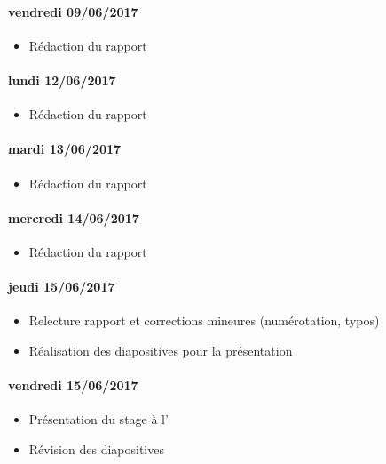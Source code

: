 \paragraph{vendredi 09/06/2017}
\begin{itemize}
  \item Rédaction du rapport
\end{itemize}

\paragraph{lundi 12/06/2017}
\begin{itemize}
  \item Rédaction du rapport
\end{itemize}

\paragraph{mardi 13/06/2017}
\begin{itemize}
  \item Rédaction du rapport
\end{itemize}

\paragraph{mercredi 14/06/2017}
\begin{itemize}
  \item Rédaction du rapport
\end{itemize}

\paragraph{jeudi 15/06/2017}
\begin{itemize}
  \item Relecture rapport et corrections mineures (numérotation, typos)
  \item Réalisation des diapositives pour la présentation
\end{itemize}

\paragraph{vendredi 15/06/2017}
\begin{itemize}
  \item Présentation du stage à l'\ifsttar
  \item Révision des diapositives
\end{itemize}


